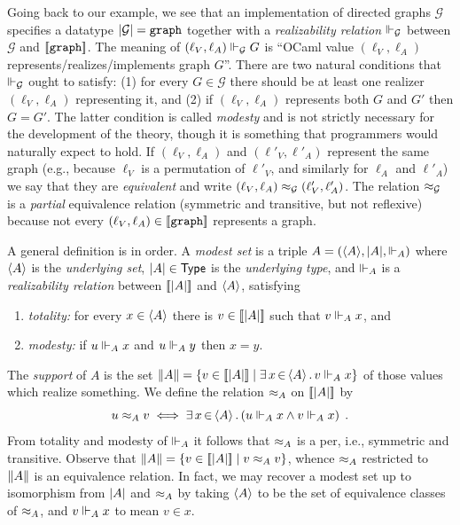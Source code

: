 Going back to our example, we see that an implementation of 
directed graphs $\mathcal{G}$ specifies a datatype
$|\mathcal{G}| = \mathtt{graph}$ together with a
\emph{realizability relation} $\Vdash_{\mathcal{G}}$ between
$\mathcal{G}$ and $[\![\mathtt{graph}]\!]$. The meaning of $(\ell_V,
\ell_A) \Vdash_\mathcal{G} G$ is ``OCaml value $(\ell_V, \ell_A)$ 
represents/realizes/implements graph $G$''. There are two natural conditions
that $\Vdash_\mathcal{G}$ ought to satisfy: (1) for every $G \in
\mathcal{G}$ there should be at least one realizer $(\ell_V, \ell_A)$
representing it, and (2) if $(\ell_V, \ell_A)$ represents both $G$ and
$G'$ then $G = G'$. The latter condition is called \emph{modesty} and
is not strictly necessary for the development of the theory, though it
is something that programmers would naturally expect to hold. If
$(\ell_V, \ell_A)$ and $(\ell'_V, \ell'_A)$ represent the same graph 
(e.g., because $\ell_V$ is a permutation of $\ell'_V$, and similarly for $\ell_A$ and $\ell'_A$)
we say that they are \emph{equivalent} and write $(\ell_V, \ell_A)
\approx_\mathcal{G} (\ell'_V, \ell'_A)$. The relation $\approx_\mathcal{G}$
is a \emph{partial} equivalence relation (symmetric and transitive,
but not reflexive) because not every $(\ell_V, \ell_A) \in
[\![\mathtt{graph}]\!]$ represents a graph.

\bigskip

A general definition is in order. A \emph{modest set} is a triple $A =
(\langle A \rangle, |A|, {\Vdash_A})$ where $\langle A \rangle$ is the
\emph{underlying set}, $|A| \in \mathsf{Type}$ is the \emph{underlying
  type}, and $\Vdash_A$ is a \emph{realizability relation} between
$[\![|A|]\!]$ and $\langle A \rangle$, satisfying
% 
\begin{enumerate}
\item \emph{totality:} for every $x \in \langle A \rangle$ there is $v \in
  [\![|A|]\!]$ such that $v \Vdash_A x$, and
\item \emph{modesty:} if $u \Vdash_A x$ and $u \Vdash_A y$ then $x = y$.
\end{enumerate}
%
The \emph{support} of $A$ is the set $\|A\| = \{v \in
  [\![|A|]\!] \mid \exists\, x \,{\in}\, \langle A \rangle\,.\,v \Vdash_A x\}$ of those
values which realize something. We define the relation $\approx_A$ on
$[\![|A|]\!]$ by
%
\begin{equation*}
  u \approx_A v
  \iff
  \exists\, x \,{\in}\, \langle A \rangle\,.\left(u \Vdash_A x \land v \Vdash_A x\right) \;.
\end{equation*}
%
From totality and modesty of $\Vdash_A$ it follows that $\approx_A$ is a per,
i.e., symmetric and transitive. Observe that $\|A\| = \{v \in
  [\![|A|]\!] \mid v \approx_A v\}$, whence $\approx_A$
restricted to $\|A\|$ is an equivalence relation. In fact, we
may recover a modest set up to isomorphism from $|A|$ and
$\approx_A$ by taking $\langle A \rangle$ to be the set of equivalence classes of
$\approx_A$, and $v \Vdash_A x$ to mean $v \in x$.

